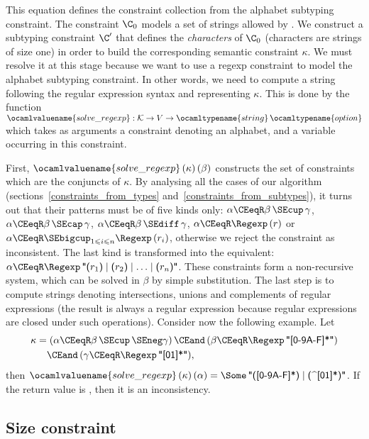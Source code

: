 This equation defines the constraint collection from the alphabet
subtyping constraint. The constraint $\C_0$ models a set of strings
allowed by \T. We construct a subtyping constraint $\C'$ that defines
the \emph{characters} of $\C_0$ (characters are strings of size one)
in order to build the corresponding semantic constraint $\kappa$. We
must resolve it at this stage because we want to use a regexp
constraint to model the alphabet subtyping constraint. In other words,
we need to compute a string following the \ASN regular expression
syntax and representing $\kappa$. This is done by the function
$\ocamlvaluename{solve\_regexp} : {\cal K} \rightarrow V \rightarrow
\ocamltypename{string} \, \ocamltypename{option}$ which takes as
arguments a constraint denoting an alphabet, and a variable occurring
in this constraint.

First, $\ocamlvaluename{solve\_regexp}\, (\kappa) \, (\beta)$
constructs the set of constraints which are the conjuncts of
$\kappa$. By analysing all the cases of our algorithm
(sections~\ref{constraints_from_types}
and~\ref{constraints_from_subtypes}), it turns out that their patterns
must be of five kinds only: $\alpha \CEeqR \beta \, \SEcup \, \gamma$,
$\alpha \CEeqR \beta \, \SEcap \, \gamma$, $\alpha \CEeqR \beta \,
\SEdiff \, \gamma$, $\alpha \CEeqR \Regexp \, (r)$ or $\alpha \CEeqR
\SEbigcup_{1 \leqslant i \leqslant n}{\Regexp \, (r_i)}$, otherwise we
reject the constraint as inconsistent. The last kind is transformed
into the equivalent: $\alpha \CEeqR \Regexp \,
\textsf{"(}r_1\textsf{)}\mid\textsf{(}r_2\textsf{)}\mid\ldots\mid\textsf{(}r_n\textsf{)"}$.
These constraints form a non-recursive system, which can be solved in
$\beta$ by simple substitution. The last step is to compute strings
denoting intersections, unions and complements of regular expressions
(the result is always a regular expression because regular expressions
are closed under such operations). Consider now the following
example. Let
\begin{align*}
\kappa &= (\alpha \CEeqR \beta \, \SEcup \, \SEneg\gamma)
\, \CEand \, (\beta \CEeqR \Regexp \, \textsf{"[0-9A-F]*"})\\
  & \hphantom{=} \; \CEand \, (\gamma \CEeqR \Regexp \, \textsf{"[01]*"}),
\end{align*}
then $\ocamlvaluename{solve\_regexp} \, (\kappa) \, (\alpha) = \Some
\, \textsf{"([0-9A-F]*)}\mid\textsf{(\symbol{94}[01]*)"}$. If the
return value is \None{}, then it is an inconsistency.


\subsection{Size constraint}\label{size_constraint}

